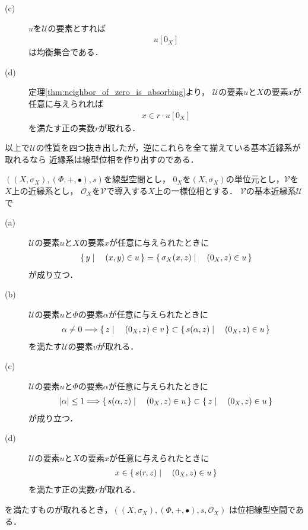 \begin{description}
		\item[(c)] $u$を$\mathscr{U}$の要素とすれば
			\begin{align}
				u[0_X]
			\end{align}
			は均衡集合である．
			
		\item[(d)] 定理\ref{thm:neighbor_of_zero_is_absorbing}より，
			$\mathscr{U}$の要素$u$と$X$の要素$x$が任意に与えられれば
			\begin{align}
				x \in r \cdot u[0_X]
			\end{align}
			を満たす正の実数$r$が取れる．
	\end{description}
	
	以上で$\mathscr{U}$の性質を四つ抜き出したが，逆にこれらを全て揃えている基本近縁系が取れるなら
	近縁系は線型位相を作り出すのである．
	
	\begin{screen}
		\begin{thm}[線型位相を導入する近縁系]
		\label{thm:entourages_introducing_vector_topology}
			$\left(\left(X,\sigma_X\right),(\Phi,+,\bullet),s\right)$を線型空間とし，
			$0_X$を$\left(X,\sigma_X\right)$の単位元とし，$\mathscr{V}$を$X$上の近縁系とし，
			$\mathscr{O}_X$を$\mathscr{V}$で導入する$X$上の一様位相とする．
			$\mathscr{V}$の基本近縁系$\mathscr{U}$で
			\begin{description}
				\item[(a)] $\mathscr{U}$の要素$u$と$X$の要素$x$が任意に与えられたときに
					\begin{align}
						\left\{\, y \mid \quad (x,y) \in u\, \right\} = \left\{\, \sigma_X(x,z) \mid \quad (0_X,z) \in u\, \right\}
					\end{align}
					が成り立つ．
						
				\item[(b)] $\mathscr{U}$の要素$u$と$\Phi$の要素$\alpha$が任意に与えられたときに
					\begin{align}
						\alpha \neq 0 \Longrightarrow \left\{\, z \mid \quad (0_X,z) \in v\, \right\} \subset \left\{\, s(\alpha,z) \mid \quad (0_X,z) \in u\, \right\}
					\end{align}
					を満たす$\mathscr{U}$の要素$v$が取れる．
					
				\item[(c)] $\mathscr{U}$の要素$u$と$\Phi$の要素$\alpha$が任意に与えられたときに
					\begin{align}
						|\alpha| \leq 1 \Longrightarrow \left\{\, s(\alpha,z) \mid \quad (0_X,z) \in u\, \right\} \subset \left\{\, z \mid \quad (0_X,z) \in u\, \right\}
					\end{align}
					が成り立つ．
					
				\item[(d)] $\mathscr{U}$の要素$u$と$X$の要素$x$が任意に与えられたときに
					\begin{align}
						x \in \left\{\, s(r,z) \mid \quad (0_X,z) \in u\, \right\}
					\end{align}
					を満たす正の実数$r$が取れる．
			\end{description}
			を満たすものが取れるとき，$\left(\left(X,\sigma_X\right),(\Phi,+,\bullet),s,\mathscr{O}_X\right)$
			は位相線型空間である．
		\end{thm}
	\end{screen}
	
